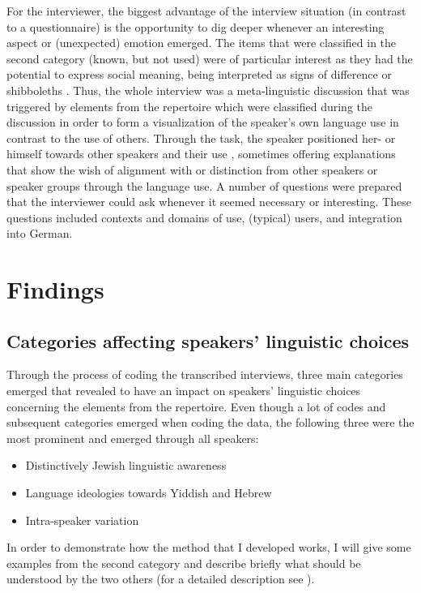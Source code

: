 \documentclass[output=paper]{langscibook}
\begin{document}
For the interviewer, the biggest advantage of the interview situation (in contrast to a questionnaire) is the opportunity to dig deeper whenever an interesting aspect or (unexpected) emotion emerged. The items that were classified in the second category (known, but not used) were of particular interest as they had the potential to express social meaning, being interpreted as signs of difference \citep{GalIrvine2019} or shibboleths \citep{BuschSpitzmüller2021}. Thus, the whole interview was a meta-linguistic discussion that was triggered by elements from the repertoire which were classified during the discussion in order to form a visualization of the speaker’s own language use in contrast to the use of others. Through the task, the speaker positioned her- or himself towards other speakers and their use \citep{Spitzmüller2013}, sometimes offering explanations that show the wish of alignment with or distinction from other speakers or speaker groups through the language use. A number of questions were prepared that the interviewer could ask whenever it seemed necessary or interesting. These questions included contexts and domains of use, (typical) users, and integration into German.

\section{Findings}
\subsection{Categories affecting speakers’ linguistic choices}

Through the process of coding the transcribed interviews, three main categories emerged that revealed to have an impact on speakers’ linguistic choices concerning the elements from the repertoire. Even though a lot of codes and subsequent categories emerged when coding the data, the following three were the most prominent and emerged through all speakers:

\begin{itemize}
\item Distinctively Jewish linguistic awareness
\item Language ideologies towards Yiddish and Hebrew
\item Intra-speaker variation
\end{itemize}

In order to demonstrate how the method that I developed works, I will give some examples from the second category and describe briefly what should be understood by the two others (for a detailed description see \citealt{JahnsToAppear}).
\end{document}
